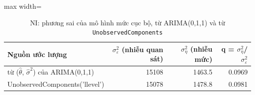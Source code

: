 \begin{table}[H]
\centering\footnotesize
\caption{NI: phương sai của mô hình mức cục bộ, từ ARIMA(0,1,1) và từ \texttt{UnobservedComponents}}\label{tab:tab_b12_07_local_level}
\begin{adjustbox}{max width=\linewidth}
\begin{tabular}{|>{\raggedright\arraybackslash}p{}|r|r|r|}
\toprule
Nguồn ước lượng & $\sigma^{2}_{\varepsilon}$ (nhiễu quan sát) & $\sigma^{2}_{\eta}$ (nhiễu mức) & q = $\sigma^{2}_{\eta}$/$\sigma^{2}_{\varepsilon}$ \\
\midrule
từ ($\hat{\theta}$, $\hat{\sigma}^{2}$) của ARIMA(0,1,1) & 15108 & 1463.5 & 0.0969 \\[3pt]
UnobservedComponents('llevel') & 15078 & 1478.8 & 0.0981 \\[3pt]
\bottomrule
\end{tabular}
\end{adjustbox}
\end{table}
